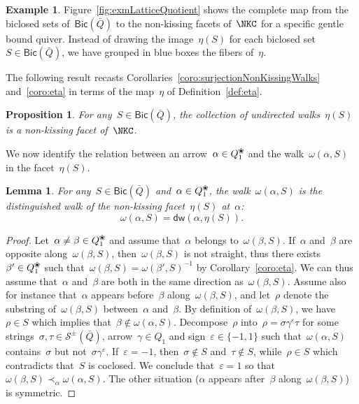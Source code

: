 \documentclass{amsart}
\newtheorem{proposition}[theorem]{Proposition}
\newtheorem{lemma}[theorem]{Lemma}
\theoremstyle{definition}
\newtheorem{example}[theorem]{Example}
\newcommand{\fref}[1]{Figure~\ref{#1}} %
\newcommand{\blossom}{^\text{\ding{96}}} %
\newcommand{\strings}{\mathcal{S}} %
\newcommand{\distinguishedWalk}[2]{\mathsf{dw}(#1,#2)} %
\newcommand{\Bicl}[1]{\mathsf{Bic}(#1)} %
\begin{document}
\begin{example}
\fref{fig:exmLatticeQuotient} shows the complete map from the biclosed sets of~$\Bicl{\bar Q}$ to the non-kissing facets of~$\NKC$ for a specific gentle bound quiver.
Instead of drawing the image~$\eta(S)$ for each biclosed set~$S \in \Bicl{\bar Q}$, we have grouped in blue boxes the fibers of~$\eta$.
\end{example}

\enlargethispage{.2cm}
The following result recasts Corollaries~\ref{coro:surjectionNonKissingWalks} and~\ref{coro:eta} in terms of the map~$\eta$ of Definition~\ref{def:eta}.

\begin{proposition}
For any~$S \in \Bicl{\bar Q}$, the collection of undirected walks~$\eta(S)$ is a non-kissing facet of~$\NKC$.
\end{proposition}

We now identify the relation between an arrow~$\alpha \in Q_1\blossom$ and the walk~$\omega(\alpha,S)$ in the facet~$\eta(S)$.

\begin{lemma}
\label{lem:distinguishedWalkEta}
For any~$S \in \Bicl{\bar Q}$ and~$\alpha \in Q_1\blossom$, the walk~$\omega(\alpha,S)$ is the distinguished walk of the non-kissing facet~$\eta(S)$ at~$\alpha$:
\[
\omega(\alpha,S) = \distinguishedWalk{\alpha}{\eta(S)}.
\]
\end{lemma}

\begin{proof}
Let~$\alpha \ne \beta \in Q_1\blossom$ and assume that~$\alpha$ belongs to~$\omega(\beta,S)$.
If~$\alpha$ and~$\beta$ are opposite along~$\omega(\beta,S)$, then~$\omega(\beta,S)$ is not straight, thus there exists~$\beta' \in Q_1\blossom$ such that~${\omega(\beta,S) = \omega(\beta',S)^{-1}}$ by Corollary~\ref{coro:eta}.
We can thus assume that~$\alpha$ and~$\beta$ are both in the same direction as~$\omega(\beta,S)$.
Assume also for instance that~$\alpha$ appears before~$\beta$ along~$\omega(\beta,S)$, and let~$\rho$ denote the substring of~$\omega(\beta,S)$ between~$\alpha$ and~$\beta$.
By definition of~$\omega(\beta,S)$, we have~$\rho \in S$ which implies that~$\beta \notin \omega(\alpha,S)$.
Decompose~$\rho$ into~$\rho = \sigma \gamma^\varepsilon \tau$ for some strings~$\sigma, \tau \in \strings^\pm(\bar Q)$, arrow~$\gamma \in Q_1$ and sign~$\varepsilon \in \{-1,1\}$ such that~$\omega(\alpha,S)$ contains~$\sigma$ but not~$\sigma \gamma^\varepsilon$.
If~$\varepsilon = -1$, then~$\sigma \notin S$ and~$\tau \notin S$, while~$\rho \in S$ which contradicts that~$S$ is coclosed.
We conclude that~$\varepsilon = 1$ so that~$\omega(\beta,S) \prec_\alpha \omega(\alpha,S)$.
The other situation ($\alpha$ appears after~$\beta$ along~$\omega(\beta,S)$) is symmetric.
\end{proof}
\end{document}
